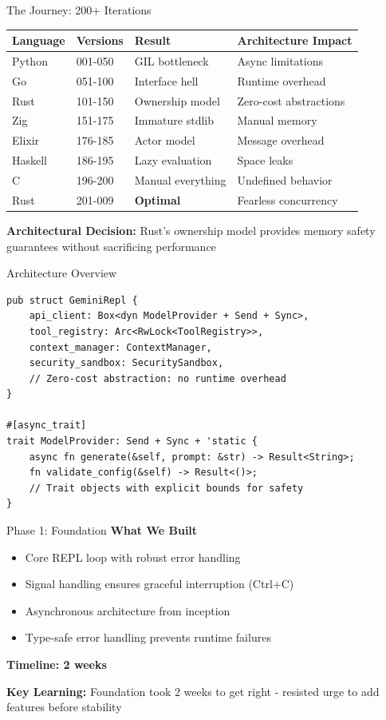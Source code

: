\documentclass[aspectratio=169]{beamer}
\begin{document}
\begin{frame}{The Journey: 200+ Iterations}
\begin{center}
\begin{tabular}{llll}
\textbf{Language} & \textbf{Versions} & \textbf{Result} & \textbf{Architecture Impact} \\
\hline
Python & 001-050 & GIL bottleneck & Async limitations \\
Go & 051-100 & Interface{} hell & Runtime overhead \\
Rust & 101-150 & Ownership model & Zero-cost abstractions \\
Zig & 151-175 & Immature stdlib & Manual memory \\
Elixir & 176-185 & Actor model & Message overhead \\
Haskell & 186-195 & Lazy evaluation & Space leaks \\
C & 196-200 & Manual everything & Undefined behavior \\
Rust & 201-009 & \textbf{Optimal} & Fearless concurrency \\
\end{tabular}
\end{center}

\textbf{Architectural Decision:} Rust's ownership model provides memory safety\\guarantees without sacrificing performance
\end{frame}

\begin{frame}[fragile]{Architecture Overview}
\begin{lstlisting}
pub struct GeminiRepl {
    api_client: Box<dyn ModelProvider + Send + Sync>,
    tool_registry: Arc<RwLock<ToolRegistry>>,
    context_manager: ContextManager,
    security_sandbox: SecuritySandbox,
    // Zero-cost abstraction: no runtime overhead
}

#[async_trait]
trait ModelProvider: Send + Sync + 'static {
    async fn generate(&self, prompt: &str) -> Result<String>;
    fn validate_config(&self) -> Result<()>;
    // Trait objects with explicit bounds for safety
}
\end{lstlisting}
\end{frame}

\begin{frame}{Phase 1: Foundation}
\textbf{What We Built}
\begin{itemize}
\item Core REPL loop with robust error handling
\item Signal handling ensures graceful interruption (Ctrl+C)
\item Asynchronous architecture from inception
\item Type-safe error handling prevents runtime failures
\end{itemize}

\textbf{Timeline: 2 weeks}

\textbf{Key Learning:} Foundation took 2 weeks to get right - resisted urge to add features before stability
\end{frame}
\end{document}
